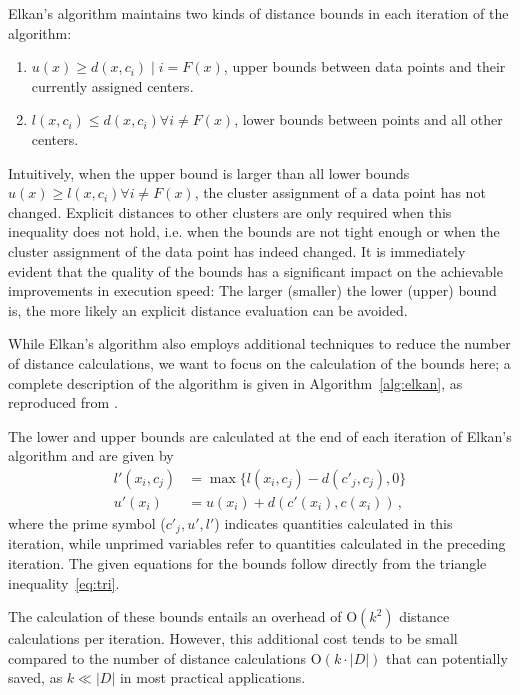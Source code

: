 Elkan's algorithm maintains two kinds of distance bounds in each iteration of the algorithm:
\begin{enumerate}[label=\roman*]
	\item $u(x) \geq d(x, c_i) \mid i = F(x)$,
	      upper bounds between data points and their currently assigned centers.
	\item $l(x, c_i) \leq d(x,c_i) \forall i \neq F(x)$,
	      lower bounds between points and all other centers.
\end{enumerate}
Intuitively, when the upper bound is larger than all lower bounds $u(x)\geq l(x,c_i) \forall i\neq F(x)$, the cluster assignment of a data point has not changed.
Explicit distances to other clusters are only required when this inequality does not hold, i.e. when the bounds are not tight enough or when the cluster assignment of the data point has indeed changed.
It is immediately evident that the quality of the bounds has a significant impact on the achievable improvements in execution speed:
The larger (smaller) the lower (upper) bound is, the more likely an explicit distance evaluation can be avoided.

While Elkan's algorithm also employs additional techniques to reduce the number of distance calculations, we want to focus on the calculation of the bounds here;
a complete description of the algorithm is given in Algorithm~\ref{alg:elkan}, as reproduced from \cite{DBLP:conf/icml/Elkan03}.

The lower and upper bounds are calculated at the end of each iteration of Elkan's algorithm and are given by
\begin{align}
	\label{eq:elkan_lower}
	l'(x_i, c_j) & = \max \{ l(x_i, c_j) - d(c'_j, c_j), 0 \} \\
	\label{eq:elkan_upper}
	u'(x_i)      & = u(x_i) + d(c'(x_i), c(x_i)) \,,
\end{align}
where the prime symbol ($c'_j, u', l'$) indicates quantities calculated in this iteration, while unprimed variables refer to quantities calculated in the preceding iteration.
The given equations for the bounds follow directly from the triangle inequality~\ref{eq:tri}.

The calculation of these bounds entails an overhead of $\mathrm{O}(k^2)$ distance calculations per iteration.
However, this additional cost tends to be small compared to the number of distance calculations $\mathrm{O}(k\cdot|D|)$ that can potentially saved,
as  $k \ll |D|$ in most practical applications.


